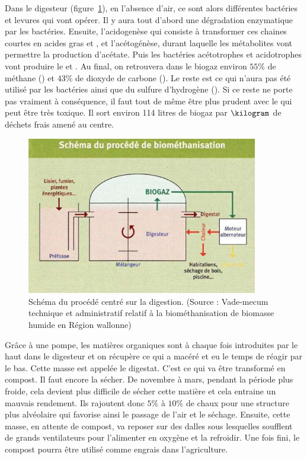 Dans le digesteur (figure~\ref{fig:biometh2}), en l'absence d'air, ce sont alors différentes bactéries et levures qui vont opérer. Il y aura tout d'abord une dégradation enzymatique par les bactéries. Ensuite, l'acidogenèse qui consiste à transformer ces chaines courtes en acides gras et , et l'acétogénèse, durant laquelle les métabolites vont permettre la production d'acétate. Puis les bactéries acétotrophes et acidotrophes vont produire le  et . Au final, on retrouvera dans le biogaz environ $55\%$ de méthane () et $43\%$ de dioxyde de carbone (). Le reste est ce qui n'aura pas été utilisé par les bactéries ainsi que du sulfure d'hydrogène (). Si ce reste ne porte pas vraiment à conséquence, il faut tout de même être plus prudent avec le  qui peut être très toxique. Il sort environ 114 litres de biogaz par $\kilogram$ de déchets frais amené au centre.

\begin{figure}
\centering
\includegraphics[width=0.9\textwidth]{img/biometh2}
\caption{Schéma du procédé centré sur la digestion. (Source : Vade-mecum technique et administratif relatif à la biométhanisation de biomasse humide en Région wallonne)}
\label{fig:biometh2}
\end{figure}

Grâce à une pompe, les matières organiques sont à chaque fois introduites par le haut dans le digesteur et on récupère ce qui a macéré et eu le temps de réagir par le bas. Cette masse est appelée le digestat. C'est ce qui va être transformé en compost. Il faut encore la sécher. De novembre à mars, pendant la période plus froide, cela devient plus difficile de sécher cette matière et cela entraine un mauvais rendement. Ils rajoutent donc $5\%$ à $10\%$ de chaux pour une structure plus alvéolaire qui favorise ainsi le passage de l'air et le séchage. Ensuite, cette masse, en attente de compost, va reposer sur des dalles sous lesquelles soufflent de grands ventilateurs pour l'alimenter en oxygène et la refroidir. Une fois fini, le compost pourra être utilisé comme engrais dans l'agriculture.

